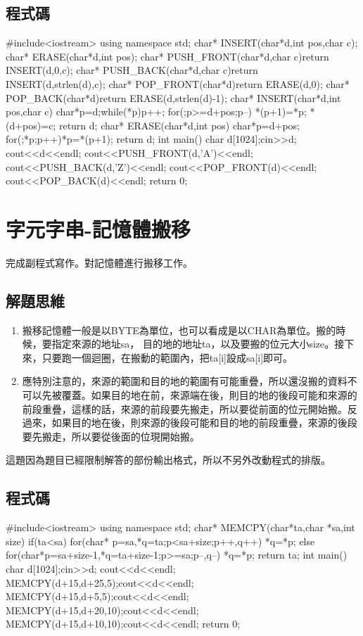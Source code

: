 \subsection{程式碼}
\begin{cppcode}
#include<iostream>
using namespace std; 
char* INSERT(char*d,int pos,char c);
char* ERASE(char*d,int pos);
char* PUSH_FRONT(char*d,char c){return INSERT(d,0,c);}
char* PUSH_BACK(char*d,char c){return INSERT(d,strlen(d),c);}
char* POP_FRONT(char*d){return ERASE(d,0);}
char* POP_BACK(char*d){return ERASE(d,strlen(d)-1);}
char* INSERT(char*d,int pos,char c){
	char*p=d;while(*p)p++;
	for(;p>=d+pos;p--) *(p+1)=*p;
	*(d+pos)=c;
	return d;
}
char* ERASE(char*d,int pos){
	char*p=d+pos;
	for(;*p;p++)*p=*(p+1);
	return d;
}
int main(){ 
	char d[1024];cin>>d;
	cout<<d<<endl;
	cout<<PUSH_FRONT(d,'A')<<endl;
	cout<<PUSH_BACK(d,'Z')<<endl;
	cout<<POP_FRONT(d)<<endl;
	cout<<POP_BACK(d)<<endl;
	return 0;
} 
\end{cppcode}

\section{字元字串-記憶體搬移}
完成副程式寫作。對記憶體進行搬移工作。

\subsection{解題思維}

\vspace{0.3cm}
\begin{enumerate}
	\item 搬移記憶體一般是以BYTE為單位，也可以看成是以CHAR為單位。搬的時候，要指定來源的地址sa，
	目的地的地址ta，以及要搬的位元大小size。接下來，只要跑一個迴圈，在搬動的範圍內，把ta[i]設成sa[i]即可。
	\item 應特別注意的，來源的範圍和目的地的範圍有可能重疊，所以還沒搬的資料不可以先被覆蓋。如果目的地在前，來源端在後，則目的地的後段可能和來源的前段重疊，這樣的話，來源的前段要先搬走，所以要從前面的位元開始搬。反過來，如果目的地在後，則來源的後段可能和目的地的前段重疊，來源的後段要先搬走，所以要從後面的位現開始搬。
\end{enumerate}

這題因為題目已經限制解答的部份輸出格式，所以不另外改動程式的排版。
\subsection{程式碼}
\begin{cppcode}
#include<iostream>
using namespace std; 
char* MEMCPY(char*ta,char *sa,int size){
	if(ta<sa) for(char* p=sa,*q=ta;p<sa+size;p++,q++) *q=*p;
	else for(char*p=sa+size-1,*q=ta+size-1;p>=sa;p--,q--) *q=*p;
	return ta;
}
int main(){ 
	char d[1024];cin>>d;
	cout<<d<<endl;
	MEMCPY(d+15,d+25,5);cout<<d<<endl;
	MEMCPY(d+15,d+5,5);cout<<d<<endl;
	MEMCPY(d+15,d+20,10);cout<<d<<endl;
	MEMCPY(d+15,d+10,10);cout<<d<<endl;
	return 0;
} 
\end{cppcode}

